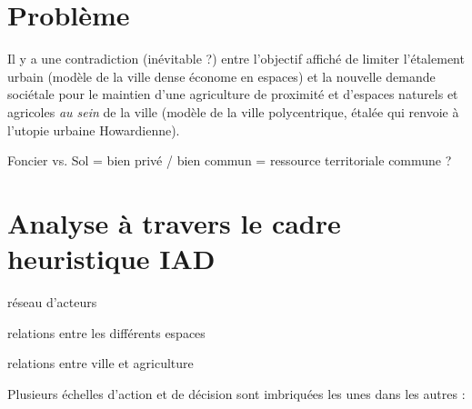 \enableregime[utf]



\section{Problème}

Il y a une contradiction (inévitable ?) entre l'objectif affiché de limiter
l'étalement urbain (modèle de la ville dense économe en espaces)
et la nouvelle demande sociétale pour le maintien d'une agriculture de proximité
et d'espaces naturels et agricoles {\it au sein} de la ville (modèle de la ville polycentrique, étalée
qui renvoie à l'utopie urbaine Howardienne).

Foncier vs. Sol
= bien privé / bien commun
= ressource territoriale commune ?

\section{Analyse à travers le cadre heuristique IAD}

\startplacefigure[location=middle,
short={Analyse de l'étalement urbain à travers le cadre IAD},
title={Analyse de l'étalement urbain à travers le cadre IAD (d'après \cite[ostrom_background_2011])}]
\stopplacefigure







\subject{Système territorial}

\startitemize[packed]

\item réseau d'acteurs
\item relations entre les différents espaces
\item relations entre ville et agriculture

\stopitemize

\page[yes]

\subject{Acteurs}

Plusieurs échelles d'action et de décision
sont imbriquées les unes dans les autres :

